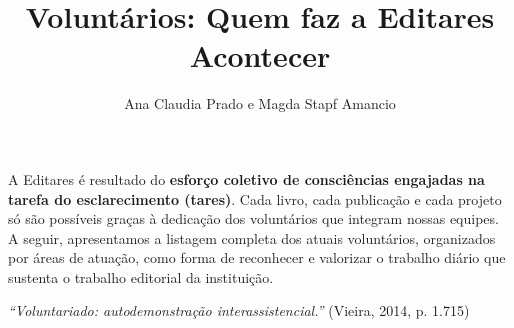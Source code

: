 \documentclass{gescons}
\author{Ana Claudia Prado e Magda Stapf Amancio}
\title{Voluntários: Quem faz a Editares Acontecer}
\begin{document}
    \makeentrevistatitle


    



A Editares é resultado do \textbf{esforço coletivo de consciências engajadas na tarefa do esclarecimento (tares)}. Cada livro, cada publicação e cada projeto só são possíveis graças à dedicação dos voluntários que integram nossas equipes. A seguir, apresentamos a listagem completa dos atuais voluntários, organizados por áreas de atuação, como forma de reconhecer e valorizar o trabalho diário que sustenta o trabalho editorial da instituição.

\emph{``Voluntariado: autodemonstração interassistencial.''} (Vieira, 2014, p. 1.715)
\end{document}
